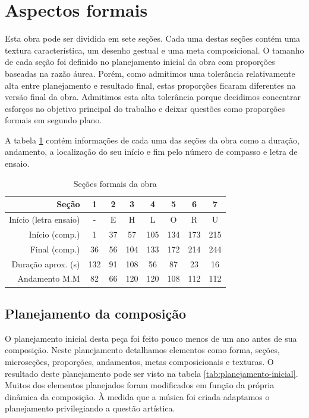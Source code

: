 \section{Aspectos formais}
\label{sec:aspectos-formais}

Esta obra pode ser dividida em sete seções. Cada uma destas seções
contém uma textura característica, um desenho gestual e uma meta
composicional. O tamanho de cada seção foi definido no planejamento
inicial da obra com proporções baseadas na razão áurea. Porém, como
admitimos uma tolerância relativamente alta entre planejamento e
resultado final, estas proporções ficaram diferentes na versão final
da obra. Admitimos esta alta tolerância porque decidimos concentrar
esforços no objetivo principal do trabalho e deixar questões como
proporções formais em segundo plano.

A tabela \ref{tab:secoes-obra} contém informações de cada uma das
seções da obra como a duração, andamento, a localização do seu início
e fim pelo número de compasso e letra de ensaio.

\begin{table}
  \centering
  \begin{tabular}{r|ccccccc}
    Seção & 1 & 2 & 3 & 4 & 5 & 6 & 7 \\
    \hline
    Início (letra ensaio) & - & E & H & L & O & R & U \\
    Início (comp.) & 1 & 37 & 57 & 105 & 134 & 173 & 215 \\
    Final (comp.) & 36 & 56 & 104 & 133 & 172 & 214 & 244 \\
    Duração aprox. (s) & 132 & 91 & 108 & 56 & 87 & 23 & 16\\
    Andamento M.M & 82 & 66 & 120 & 120 & 108 & 112 & 112 \\
  \end{tabular}
  \caption{Seções formais da obra}
  \label{tab:secoes-obra}
\end{table}

\subsection{Planejamento da composição}
\label{sec:plan-da-comp}

O planejamento inicial desta peça foi feito pouco menos de um ano
antes de sua composição. Neste planejamento detalhamos elementos como
forma, seções, microseções, proporções, andamentos, metas
composicionais e texturas. O resultado deste planejamento pode ser
visto na tabela \ref{tab:planejamento-inicial}. Muitos dos elementos
planejados foram modificados em função da própria dinâmica da
composição. À medida que a música foi criada adaptamos o planejamento
privilegiando a questão artística.


